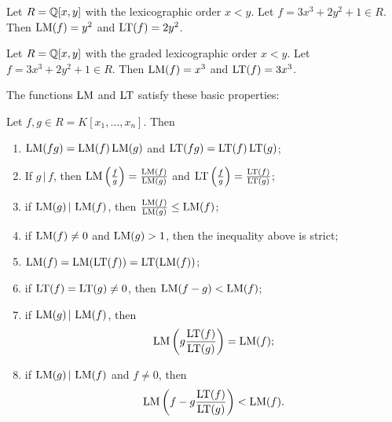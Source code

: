 \begin{example}
  Let $R = \bb Q[x,y]$ with the lexicographic order $x < y$.
  Let $f = 3x^3 + 2y^2 + 1 \in R$.
  Then $\LM(f) = y^2$ and $\LT(f) = 2y^2$.
\end{example}
\begin{example}
  Let $R = \bb Q[x,y]$ with the graded lexicographic order $x < y$.
  Let $f = 3x^3 + 2y^2 + 1 \in R$.
  Then $\LM(f) = x^3$ and $\LT(f) = 3x^3$.
\end{example}

The functions $\LM$ and $\LT$ satisfy these basic properties:
\begin{proposition}
  \label{prop_lm}
  Let $f, g \in R = K[x_1, \ldots, x_n]$. Then
  \begin{enumerate}[label=(\roman*)]
    \item $\LM(fg) = \LM(f)\LM(g)$ and $\LT(fg) = \LT(f)\LT(g)$;
    \item If $g \,|\, f$, then $\LM\left(\frac f g \right) = \frac{\LM(f)}{\LM(g)}$ and $\LT\left(\frac f g \right) = \frac{\LT(f)}{\LT(g)}$;
    \item if $\LM(g) \,|\, \LM(f)$, then $\frac{\LM(f)}{\LM(g)} \leq \LM(f)$;
    \item if $\LM(f) \neq 0$ and $\LM(g) > 1$, then the inequality above is strict;
    \item $\LM(f) = \LM(\LT(f)) = \LT(\LM(f))$;
    \item if $\LT(f) = \LT(g) \neq 0$, then $\LM(f - g) < \LM(f)$;
    \item if $\LM(g) \,|\, \LM(f)$, then \[ \LM\left( g \frac{\LT(f)}{\LT(g)} \right) = \LM(f); \]
    \item if $\LM(g) \,|\, \LM(f)$ and $f \neq 0$, then \[ \LM\left( f - g \frac{\LT(f)}{\LT(g)} \right) < \LM(f). \]
  \end{enumerate}
\end{proposition}
